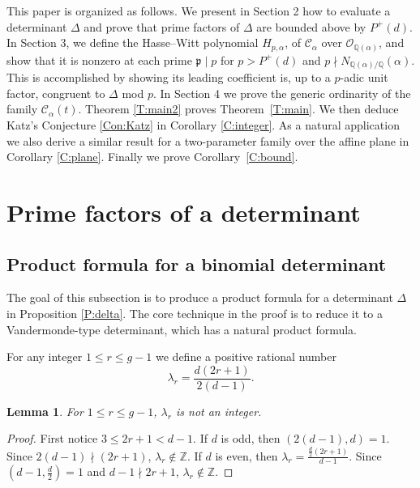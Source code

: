 \documentclass{amsart}
\theoremstyle{plain}
\newtheorem{lemma}[theorem]{Lemma}
\theoremstyle{remark}
\theoremstyle{remark}
\newcommand{\fp}{\mathfrak{p}}
\newcommand{\cO}{\mathcal{O}}
\newcommand{\cC}{\mathcal{C}}
\newcommand{\0}{\mathbf{0}}
\newcommand{\1}{\mathbf{1}}
\newcommand{\Q}{\mathbb{Q}}
\newcommand{\Z}{\mathbb{Z}}
\begin{document}
\vspace{4mm}
This paper is organized as follows. 
We present in Section 2 how to evaluate a determinant 
$\Delta$ and prove that prime factors of $\Delta$ are bounded above by  $P^+(d)$.
In Section 3, we define the Hasse--Witt polynomial $H_{p,\alpha}$, 
of $\cC_\alpha$ over $\cO_{\Q(\alpha)}$, 
and show that it is nonzero at each prime $\fp\mid p$ 
for $p>P^+(d)$ and $p\nmid N_{\Q(\alpha)/\Q}(\alpha)$.
This is accomplished by showing 
its leading coefficient is, up to a $p$-adic unit factor, 
congruent to $\Delta$ mod $p$. 
In Section 4 we prove the generic ordinarity
of the family $\cC_\alpha(t)$. Theorem \ref{T:main2}
proves  Theorem~\ref{T:main}. 
We then deduce Katz's Conjecture \ref{Con:Katz} in 
Corollary \ref{C:integer}.
As a natural application we also derive a similar result for a two-parameter family over the affine plane
in Corollary \ref{C:plane}. 
Finally we prove Corollary~\ref{C:bound}.

\section{Prime factors of a determinant}

\subsection{Product formula for a binomial determinant}
\label{S:Product}

The goal of this subsection is to produce a product formula for a determinant $\Delta$ in Proposition \ref{P:delta}.
The core technique in the proof is to reduce it to a 
Vandermonde-type determinant, which has a natural product formula.


For any integer $1\le r\le g-1$ we define a positive 
rational number
\begin{equation}\label{E:lambda}
\lambda_r=\frac{d(2r+1)}{2(d-1)}.
\end{equation}

\begin{lemma} \label{L:1}
For $1\le r\le g-1$, $\lambda_r$ is not an integer. 
\end{lemma}
\begin{proof}
First notice $3\le 2r+1<d-1$.
If $d$ is odd, then $(2(d-1),d)=1$. Since $2(d-1)\nmid (2r+1)$, $\lambda_r\not\in\Z$.
If $d$ is even, then $\lambda_r=\frac{\frac{d}{2}(2r+1)}{d-1}$.
Since $(d-1,\frac{d}{2})=1$ and $d-1\nmid 2r+1$, $\lambda_r\not\in\Z$.
\end{proof}
\end{document}
